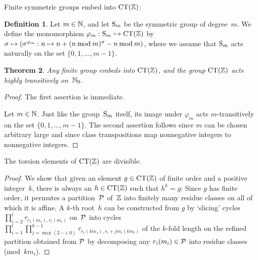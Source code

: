 \documentclass{amsart}
\theoremstyle{definition} \newtheorem{CTZDefinition}{Definition}[section]
\theoremstyle{plain}      \newtheorem{CTZPropertiesTheorem}[CTZDefinition]{Theorem}
\theoremstyle{plain}      \newtheorem{CTZSubgroupsTheorem}[CTZDefinition]{Theorem}
\theoremstyle{definition} \newtheorem{RcwaMappingDefinition}{Definition}[section]
\theoremstyle{definition} \newtheorem{RCWADefinition}[RcwaMappingDefinition]{Definition}
\theoremstyle{plain}      \newtheorem{CTZNotFinitelyGeneratedTheorem}
\theoremstyle{definition} \newtheorem{CTZSmEmbeddingDefinition}[RcwaMappingDefinition]{Definition}
\theoremstyle{plain}      \newtheorem{CTZHighlyTransitiveTheorem}[RcwaMappingDefinition]{Theorem}
\theoremstyle{plain}      \newtheorem{CTZTorsionElementsDivisibleTheorem}
\theoremstyle{plain}      \newtheorem{CTLemma}{Lemma}[section]
\theoremstyle{plain}      \newtheorem{IntegralCommutatorLemma}[CTLemma]{Lemma}
\theoremstyle{plain}      \newtheorem{NormalSubgroupContainsIntegralElementLemma}[CTLemma]{Lemma}
\theoremstyle{plain}      \newtheorem{CTZSimpleTheorem}[CTLemma]{Theorem}
\theoremstyle{remark}     \newtheorem{CTZSimpleRemark}[CTLemma]{Remark}
\theoremstyle{definition} \newtheorem{CTPZDefinition}[CTLemma]{Definition}
\theoremstyle{plain}      \newtheorem{CTPZSimpleCorollary}[CTLemma]{Corollary}
\theoremstyle{plain}      \newtheorem{CTPZSimpleProblem}[CTLemma]{Problem}
\theoremstyle{plain}      \newtheorem{FnPSL2ZEmbeddingTheorem}{Theorem}[section]
\theoremstyle{plain}      \newtheorem{FreeProductEmbeddingTheorem}[FnPSL2ZEmbeddingTheorem]{Theorem}
\theoremstyle{definition} \newtheorem{RestrictionMonomorphismDefinition}
\theoremstyle{plain}      \newtheorem{DirectAndWreathProductsEmbeddingTheorem}
\theoremstyle{plain}      \newtheorem{DirectAndWreathProductsEmbeddingCorollary}
\theoremstyle{definition} \newtheorem{CTintZDefinition}[FnPSL2ZEmbeddingTheorem]{Definition}
\theoremstyle{plain}      \newtheorem{CTintZSimpleTheorem}[FnPSL2ZEmbeddingTheorem]{Theorem}
\theoremstyle{definition} \newtheorem{KernelDefinition}{Definition}[section]
\theoremstyle{definition} \newtheorem{TameWildDefinition}[KernelDefinition]{Definition}
\theoremstyle{definition} \newtheorem{SimpleSupergroupsDefinition}[KernelDefinition]{Definition}
\theoremstyle{definition} \newtheorem{CSCRDefinition}[KernelDefinition]{Definition}
\theoremstyle{plain}      \newtheorem{SimpleSupergroupsGeneratorsTheorem}[KernelDefinition]{Theorem}
\theoremstyle{plain}      \newtheorem{SimpleSupergroupsTheorem}[KernelDefinition]{Theorem}
\theoremstyle{plain}      \newtheorem{SimpleSupergroupsTransitivityTheorem}
\theoremstyle{plain}      \newtheorem{TameGenerationConjecture}[KernelDefinition]{Conjecture}
\theoremstyle{remark}     \newtheorem{TameGenerationRemark}[KernelDefinition]{Remark}
\begin{document}
\noindent Finite symmetric groups embed into \(\CT{\ZZ}\):

\begin{CTZSmEmbeddingDefinition} \label{CTZSmEmbeddingDefinition}
  Let \(m \in \mathbb{N}\), and let \(\Sym{m}\) be the symmetric group of degree~\(m\).
  We define the monomorphism \(\varphi_m: {\rm S}_m \hookrightarrow \CT{\ZZ}\) by
  \(\sigma \mapsto \left(\sigma^{\varphi_m}: n \mapsto n + (n \hspace{-1.6mm} \mod
  \hspace{-0.4mm} m)^\sigma - n \hspace{-1.6mm} \mod \hspace{-0.4mm} m \right)\),
  where we assume that \(\Sym{m}\) acts naturally on the set \(\{0,1, \dots, m-1\}\).
\end{CTZSmEmbeddingDefinition}

\begin{CTZHighlyTransitiveTheorem} \label{CTZHighlyTransitiveTheorem}
  Any finite group embeds into \(\CT{\ZZ}\), and the group \(\CT{\ZZ}\) acts highly
  transitively on~\(\mathbb{N}_0\).
\end{CTZHighlyTransitiveTheorem}
\begin{proof}
  The first assertion is immediate.

  Let \(m \in \mathbb{N}\). Just like the group~\(\Sym{m}\) itself, its image under \(\varphi_m\) acts
  \(m\)-transitively on the set \(\{0,1, \dots, m-1\}\). The second assertion follows since \(m\)
  can be chosen arbitrary large and since class transpositions map nonnegative integers to
  nonnegative integers.
\end{proof}

\begin{CTZTorsionElementsDivisibleTheorem} \label{CTZTorsionElementsDivisibleTheorem}
  The torsion elements of \(\CT{\ZZ}\) are divisible.
\end{CTZTorsionElementsDivisibleTheorem}
\begin{proof}
  We show that given an element \(g \in \CT{\ZZ}\) of finite order and a positive
  integer~\(k\), there is always an \(h \in \CT{\ZZ}\) such that \(h^k = g\):
  Since \(g\) has finite order, it permutes a partition~\(\mathcal{P}\)
  of~\(\mathbb{Z}\) into finitely many residue classes on all of which it is affine.
  A \(k\)-th root~\(h\) can be constructed from \(g\) by `slicing' cycles
  \(\prod_{i=2}^l \tau_{r_1(m_1),r_i(m_i)}\) on~\(\mathcal{P}\) into cycles
  \(\prod_{i=1}^l \prod_{j=\max(2-i,0)}^{k-1} \tau_{r_1(km_1),r_i+jm_i(km_i)}\) of the
  \(k\)-fold length on the refined partition obtained from \(\mathcal{P}\) by decomposing
  any \(r_i(m_i) \in \mathcal{P}\) into residue classes (mod~\(km_i\)).
\end{proof}
\end{document}
